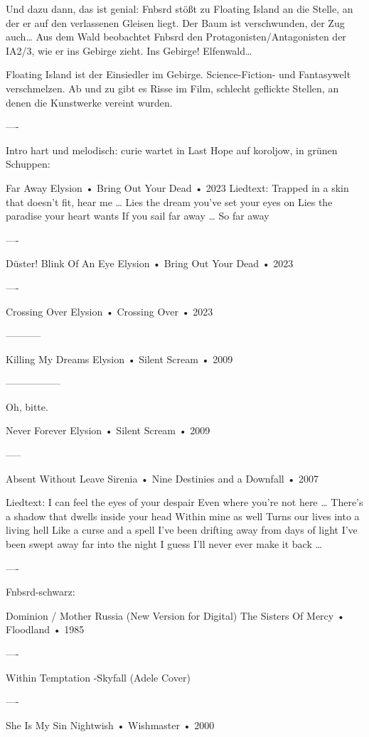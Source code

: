 Und dazu dann, das ist genial: Fnbsrd stößt zu Floating Island an die Stelle, an der er auf den verlassenen Gleisen liegt. Der Baum ist verschwunden, der Zug auch… Aus dem Wald beobachtet Fnbsrd den Protagonisten/Antagonisten der IA2/3, wie er ins Gebirge zieht. Ins Gebirge! Elfenwald…

Floating Island ist der Einsiedler im Gebirge. Science-Fiction- und Fantasywelt verschmelzen. Ab und zu gibt es Risse im Film, schlecht geflickte Stellen, an denen die Kunstwerke vereint wurden.

----

Intro hart und melodisch: curie wartet in Last Hope auf koroljow, in grünen Schuppen:

Far Away
Elysion
 •
Bring Out Your Dead
 •
2023
Liedtext:
Trapped in a skin that doesn't fit, hear me
…
Lies the dream you've set your eyes on
Lies the paradise your heart wants
If you sail far away
…
So far away

----

Düster!
Blink Of An Eye
Elysion
 •
Bring Out Your Dead
 •
2023

----

Crossing Over
Elysion
 •
Crossing Over
 •
2023

—--------

Killing My Dreams
Elysion
 •
Silent Scream
 •
2009

—--------------

Oh, bitte.

Never Forever
Elysion
 •
Silent Scream
 •
2009

-----

Absent Without Leave
Sirenia
 •
Nine Destinies and a Downfall
 •
2007

Liedtext:
I can feel the eyes of your despair
Even where you're not here
…
There's a shadow that dwells inside your head
Within mine as well
Turns our lives into a living hell
Like a curse and a spell
I've been drifting away from days of light
I've been swept away far into the night
I guess I'll never ever make it back
…

----

Fnbsrd-schwarz:

Dominion / Mother Russia (New Version for Digital)
The Sisters Of Mercy • Floodland • 1985

----

Within Temptation -Skyfall (Adele Cover)

----

She Is My Sin
Nightwish
 •
Wishmaster
 • 2000


